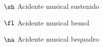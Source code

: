 \begin{simbolos}
  \item[$ \sh $] Acidente musical sustenido
  \item[$ \fl $] Acidente musical bemol
  \item[$ \na $] Acidente musical bequadro
\end{simbolos}
